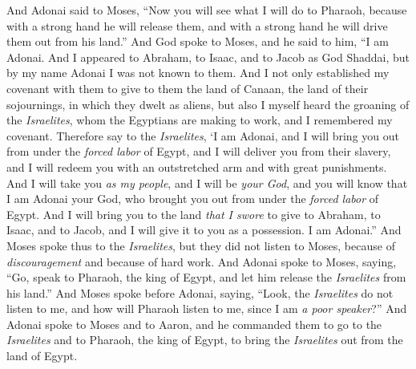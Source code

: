 \begin{biblechapter} %
 And Adonai said to Moses, “Now you will see what I will do to Pharaoh, because with a strong hand he will release them, and with a strong hand he will drive them out from his land.”
\verse And God spoke to Moses, and he said to him, “I am Adonai.
\verse And I appeared to Abraham, to Isaac, and to Jacob as God Shaddai, but by my name Adonai I was not known to them.
\verse And I not only established my covenant with them to give to them the land of Canaan, the land of their sojournings, in which they dwelt as aliens,
\verse but also I myself heard the groaning of the \textit{Israelites}, whom the Egyptians are making to work, and I remembered my covenant.
\verse Therefore say to the \textit{Israelites}, ‘I am Adonai, and I will bring you out from under the \textit{forced labor} of Egypt, and I will deliver you from their slavery, and I will redeem you with an outstretched arm and with great punishments.
\verse And I will take you \textit{as my people}, and I will be \textit{your God}, and you will know that I am Adonai your God, who brought you out from under the \textit{forced labor} of Egypt.
\verse And I will bring you to the land \textit{that I swore} to give to Abraham, to Isaac, and to Jacob, and I will give it to you as a possession. I am Adonai.”
\verse And Moses spoke thus to the \textit{Israelites}, but they did not listen to Moses, because of \textit{discouragement} and because of hard work.
\verse And Adonai spoke to Moses, saying,
\verse “Go, speak to Pharaoh, the king of Egypt, and let him release the \textit{Israelites} from his land.”
\verse And Moses spoke before Adonai, saying, “Look, the \textit{Israelites} do not listen to me, and how will Pharaoh listen to me, since I am \textit{a poor speaker}?”
\verse And Adonai spoke to Moses and to Aaron, and he commanded them to go to the \textit{Israelites} and to Pharaoh, the king of Egypt, to bring the \textit{Israelites} out from the land of Egypt.

\end{biblechapter}
